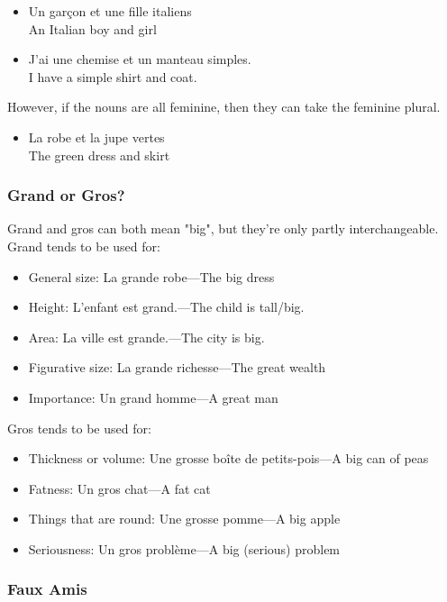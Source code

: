 \begin{itemize}
  \item  Un garçon et une fille italiens \\ An Italian boy and girl
  \item  J'ai une chemise et un manteau simples. \\ I have a simple shirt and coat.
\end{itemize}

However, if the nouns are all feminine, then they can take the feminine plural.

\begin{itemize}
  \item  La robe et la jupe vertes \\ The green dress and skirt
\end{itemize}

\pagebreak
\subsubsection{Grand or Gros?}

Grand and gros can both mean "big", but they're only partly interchangeable.  Grand tends to be used for:

\begin{itemize}
  \item  General size: La grande robe---The big dress
  \item  Height: L'enfant est grand.---The child is tall/big.
  \item  Area: La ville est grande.---The city is big.
  \item  Figurative size: La grande richesse---The great wealth
  \item  Importance: Un grand homme---A great man
\end{itemize}

Gros tends to be used for:

\begin{itemize}
  \item  Thickness or volume: Une grosse boîte de petits-pois---A big can of peas
  \item  Fatness: Un gros chat---A fat cat
  \item  Things that are round: Une grosse pomme---A big apple
  \item  Seriousness: Un gros probl{\`e}me---A big (serious) problem
\end{itemize}

\subsubsection{Faux Amis}

